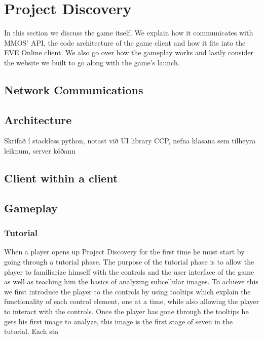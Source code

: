 \section{Project Discovery}\label{sec:projectdiscovery}

	In this section we discuss the game itself. We explain how it communicates with MMOS' API, the code architecture of the game client and how it fits into the EVE Online client. We also go over how the gameplay works and lastly consider the website we built to go along with the game's launch.

\subsection{Network Communications}

\subsection{Architecture}

	Skrifað í stackless python, notast við UI library CCP, nefna klasana sem tilheyra leiknum, server kóðann

\subsection{Client within a client}

\subsection{Gameplay}

	\subsubsection{Tutorial}
		When a player opens up Project Discovery for the first time he must start by going through a tutorial phase. The purpose of the tutorial phase is to allow the player to familiarize himself with the controls and the user interface of the game as well as teaching him the basics of analyzing subcellular images. To achieve this we first introduce the player to the controls by using tooltips which explain the functionality of each control element, one at a time, while also allowing the player to interact with the controls. Once the player has gone through the tooltips he gets his first image to analyze, this image is the first stage of seven in the tutorial. Each sta

